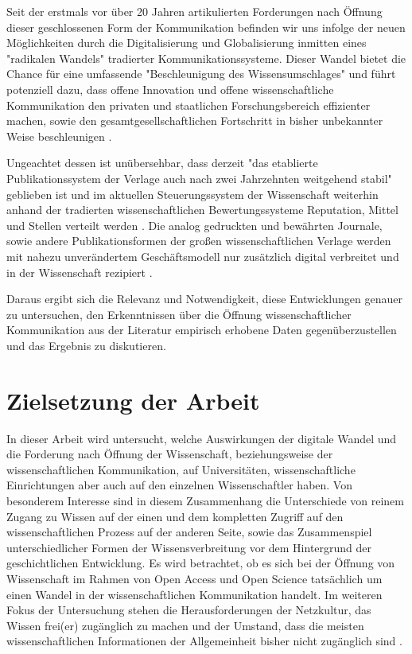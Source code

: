 Seit der erstmals vor über 20 Jahren artikulierten Forderungen nach Öffnung dieser geschlossenen Form der Kommunikation befinden wir uns infolge der neuen Möglichkeiten durch die Digitalisierung und Globalisierung \cite{mcluhan_1962_gutenberg} inmitten eines "radikalen Wandels" \cite{poynder_2011_suber} tradierter Kommunikationssysteme. Dieser Wandel bietet die Chance für eine umfassende "Beschleunigung des Wissensumschlages" \cite{Wenzel_2003} und führt potenziell dazu, dass offene Innovation und offene wissenschaftliche Kommunikation den privaten und staatlichen Forschungsbereich effizienter machen, sowie den gesamtgesellschaftlichen Fortschritt in bisher unbekannter Weise beschleunigen \cite{cite:7}.

Ungeachtet dessen ist unübersehbar, dass derzeit "das etablierte Publikationssystem der Verlage auch nach zwei Jahrzehnten weitgehend stabil" \cite{Hanekop_2014} geblieben ist und im aktuellen Steuerungssystem der Wissenschaft weiterhin anhand der tradierten wissenschaftlichen Bewertungssysteme Reputation, Mittel und Stellen verteilt werden \cite{cite:4}. Die analog gedruckten und bewährten Journale, sowie andere Publikationsformen der großen wissenschaftlichen Verlage werden mit nahezu unverändertem Geschäftsmodell nur zusätzlich digital verbreitet \cite{Hanekop_2014} \cite{boai_2012} und in der Wissenschaft rezipiert \cite{suchen}.

Daraus ergibt sich die Relevanz und Notwendigkeit, diese Entwicklungen genauer zu untersuchen, den Erkenntnissen über die Öffnung wissenschaftlicher Kommunikation aus der Literatur empirisch erhobene Daten gegenüberzustellen und das Ergebnis zu diskutieren.

\section{Zielsetzung der Arbeit}

In dieser Arbeit wird untersucht, welche Auswirkungen der digitale Wandel und die Forderung nach Öffnung der Wissenschaft, beziehungsweise der wissenschaftlichen Kommunikation, auf Universitäten, wissenschaftliche Einrichtungen aber auch auf den einzelnen Wissenschaftler haben. Von besonderem Interesse sind in diesem Zusammenhang die Unterschiede von reinem Zugang zu Wissen auf der einen und dem kompletten Zugriff auf den wissenschaftlichen Prozess auf der anderen Seite, sowie das Zusammenspiel unterschiedlicher Formen der Wissensverbreitung vor dem Hintergrund der geschichtlichen Entwicklung. Es wird betrachtet, ob es sich bei der Öffnung von Wissenschaft im Rahmen von Open Access und Open Science tatsächlich um einen Wandel in der wissenschaftlichen Kommunikation handelt. Im weiteren Fokus der Untersuchung stehen die Herausforderungen der Netzkultur, das Wissen frei(er) zugänglich zu machen und der Umstand, dass die meisten wissenschaftlichen Informationen der Allgemeinheit bisher nicht zugänglich sind \cite{cite:6}.

